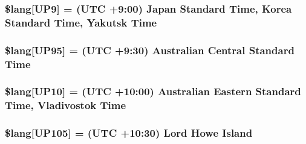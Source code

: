 \subsubsection[{\$lang}]{\setlength{\rightskip}{0pt plus 5cm}\$lang\mbox{[}\textquotesingle{}U\+P9\textquotesingle{}\mbox{]} = \textquotesingle{}(U\+T\+C +9\+:00) Japan Standard Time, Korea Standard Time, Yakutsk Time\textquotesingle{}}\label{_admin_2system_2language_2english_2date__lang_8php_aa112bfd057369e5adb437c55457c9f79}
\hypertarget{_admin_2system_2language_2english_2date__lang_8php_a96965669ac4830ab024b39a4ebb763f1}{}
\subsubsection[{\$lang}]{\setlength{\rightskip}{0pt plus 5cm}\$lang\mbox{[}\textquotesingle{}U\+P95\textquotesingle{}\mbox{]} = \textquotesingle{}(U\+T\+C +9\+:30) Australian Central Standard Time\textquotesingle{}}\label{_admin_2system_2language_2english_2date__lang_8php_a96965669ac4830ab024b39a4ebb763f1}
\hypertarget{_admin_2system_2language_2english_2date__lang_8php_ab55df5b1ac6457c16ea32f01070966f6}{}
\subsubsection[{\$lang}]{\setlength{\rightskip}{0pt plus 5cm}\$lang\mbox{[}\textquotesingle{}U\+P10\textquotesingle{}\mbox{]} = \textquotesingle{}(U\+T\+C +10\+:00) Australian Eastern Standard Time, Vladivostok Time\textquotesingle{}}\label{_admin_2system_2language_2english_2date__lang_8php_ab55df5b1ac6457c16ea32f01070966f6}
\hypertarget{_admin_2system_2language_2english_2date__lang_8php_aeb674ae9d76fd6d0d9c9e77ed5a212e9}{}
\subsubsection[{\$lang}]{\setlength{\rightskip}{0pt plus 5cm}\$lang\mbox{[}\textquotesingle{}U\+P105\textquotesingle{}\mbox{]} = \textquotesingle{}(U\+T\+C +10\+:30) Lord Howe Island\textquotesingle{}}\label{_admin_2system_2language_2english_2date__lang_8php_aeb674ae9d76fd6d0d9c9e77ed5a212e9}
\hypertarget{_admin_2system_2language_2english_2date__lang_8php_a463ad4d63523352c17685f734b4ec7cc}{}
